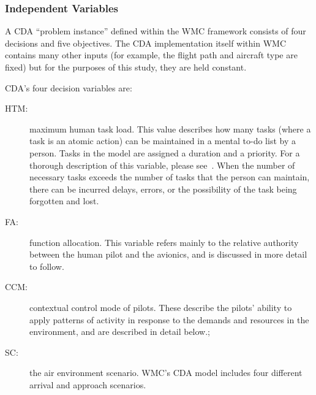 \documentclass[journal]{IEEEtran}
\newenvironment{changed}{\par}{\par}
\begin{document}
\subsubsection{Independent Variables}

A CDA ``problem instance'' defined within the WMC framework consists of four decisions and five objectives.  
The CDA implementation itself within WMC contains many other inputs (for example, the flight path and aircraft type are fixed) but for the purposes of this study, they are held constant. 


CDA's four decision variables are:
\begin{description}
\item[HTM:] maximum human task load. This value describes how many tasks (where a task is an atomic action) can be maintained in a mental to-do list by a person.  Tasks in the model are assigned a duration and a priority. For a thorough description of this variable, please see~\cite{Kim2011}. When the number of necessary tasks exceeds the number of tasks that the person can maintain, there can be incurred delays, errors, or the possibility of the task being forgotten and lost.
\item[FA:] function allocation.  This variable refers mainly to the relative authority between the human pilot and the avionics, and is discussed in more detail to follow.
\item[CCM:] contextual control mode of pilots. These describe the pilots' ability to apply patterns of activity in response to the demands and resources in the environment, and are described in detail below.;
\item[SC:] the  air environment  scenario.  WMC's CDA model includes four different arrival and approach scenarios.
\end{description} 
\end{document}
